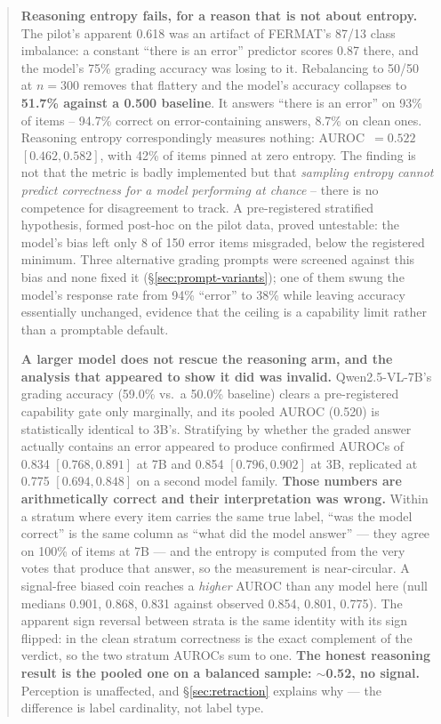 \documentclass[11pt]{article}
\begin{document}
\begin{abstract}
\textbf{Reasoning entropy fails, for a reason that is not about entropy.}
The pilot's apparent 0.618 was an artifact of FERMAT's 87/13 class imbalance:
a constant ``there is an error'' predictor scores 0.87 there, and the model's
75\% grading accuracy was losing to it. Rebalancing to 50/50 at $n=300$ removes
that flattery and the model's accuracy collapses to \textbf{51.7\% against a
0.500 baseline}. It answers ``there is an error'' on 93\% of items --
94.7\% correct on error-containing answers, 8.7\% on clean ones. Reasoning
entropy correspondingly measures nothing: AUROC~$=0.522$ $[0.462, 0.582]$, with
42\% of items pinned at zero entropy. The finding is not that the metric is
badly implemented but that \emph{sampling entropy cannot predict correctness for
a model performing at chance} -- there is no competence for disagreement to
track. A pre-registered stratified hypothesis, formed post-hoc on the pilot
data, proved untestable: the model's bias left only 8 of 150 error items
misgraded, below the registered minimum. Three alternative grading prompts
were screened against this bias and none fixed it
(\S\ref{sec:prompt-variants}); one of them swung the model's response rate
from 94\% ``error'' to 38\% while leaving accuracy essentially unchanged,
evidence that the ceiling is a capability limit rather than a promptable
default.

\textbf{A larger model does not rescue the reasoning arm, and the analysis
that appeared to show it did was invalid.} Qwen2.5-VL-7B's grading accuracy
(59.0\% vs.\ a 50.0\% baseline) clears a pre-registered capability gate only
marginally, and its pooled AUROC (0.520) is statistically identical to 3B's.
Stratifying by whether the graded answer actually contains an error appeared
to produce confirmed AUROCs of 0.834 $[0.768, 0.891]$ at 7B and 0.854
$[0.796, 0.902]$ at 3B, replicated at 0.775 $[0.694, 0.848]$ on a second
model family. \textbf{Those numbers are arithmetically correct and their
interpretation was wrong.} Within a stratum where every item carries the same
true label, ``was the model correct'' is the same column as ``what did the
model answer'' --- they agree on 100\% of items at 7B --- and the entropy is
computed from the very votes that produce that answer, so the measurement is
near-circular. A signal-free biased coin reaches a \emph{higher} AUROC than
any model here (null medians 0.901, 0.868, 0.831 against observed 0.854,
0.801, 0.775). The apparent sign reversal between strata is the same identity
with its sign flipped: in the clean stratum correctness is the exact
complement of the verdict, so the two stratum AUROCs sum to one. \textbf{The
honest reasoning result is the pooled one on a balanced sample: $\sim$0.52,
no signal.} Perception is unaffected, and \S\ref{sec:retraction} explains
why --- the difference is label cardinality, not label type.


\end{abstract}
\end{document}
